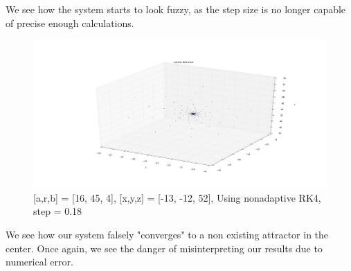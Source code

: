 \documentclass[12pt]{article}\pagestyle{myheadings}
\theoremstyle{plain}
\begin{document}
We see how the system starts to look fuzzy, as the step size is no longer capable of precise enough calculations. 

\begin{figure}[H]
\centering
\includegraphics[scale=.45]{018}
\caption{[a,r,b] = [16, 45, 4], [x,y,z] = [-13, -12, 52], Using nonadaptive RK4, step = 0.18}
\label{fig:my_label}
\end{figure}

We see how our system falsely "converges" to a non existing attractor in the center. Once again, we see the danger of misinterpreting our results due to numerical error. 
\end{document}
